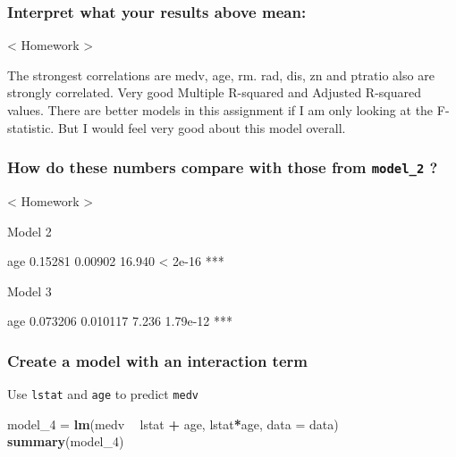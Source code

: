 \documentclass[]{article}
\newenvironment{Shaded}{\begin{snugshade}}{\end{snugshade}}
\newcommand{\DataTypeTok}[1]{\textcolor[rgb]{0.13,0.29,0.53}{#1}}
\newcommand{\DecValTok}[1]{\textcolor[rgb]{0.00,0.00,0.81}{#1}}
\newcommand{\KeywordTok}[1]{\textcolor[rgb]{0.13,0.29,0.53}{\textbf{#1}}}
\newcommand{\NormalTok}[1]{#1}
\newcommand{\OperatorTok}[1]{\textcolor[rgb]{0.81,0.36,0.00}{\textbf{#1}}}
\newcommand{\StringTok}[1]{\textcolor[rgb]{0.31,0.60,0.02}{#1}}
\begin{document}
\hypertarget{interpret-what-your-results-above-mean-3}{%
\subsubsection{Interpret what your results above
mean:}\label{interpret-what-your-results-above-mean-3}}

\textless{} Homework \textgreater{}

The strongest correlations are medv, age, rm. rad, dis, zn and ptratio
also are strongly correlated. Very good Multiple R-squared and Adjusted
R-squared values. There are better models in this assignment if I am
only looking at the F-statistic. But I would feel very good about this
model overall.

\hypertarget{how-do-these-numbers-compare-with-those-from-model_2}{%
\subsubsection{\texorpdfstring{How do these numbers compare with those
from \texttt{model\_2}
?}{How do these numbers compare with those from model\_2 ?}}\label{how-do-these-numbers-compare-with-those-from-model_2}}

\textless{} Homework \textgreater{}

Model 2

age 0.15281 0.00902 16.940 \textless{} 2e-16 ***

Model 3

age 0.073206 0.010117 7.236 1.79e-12 ***

\hypertarget{create-a-model-with-an-interaction-term}{%
\subsubsection{Create a model with an interaction
term}\label{create-a-model-with-an-interaction-term}}

Use \texttt{lstat} and \texttt{age} to predict \texttt{medv}

\begin{Shaded}
\begin{Highlighting}[]
\NormalTok{model_}\DecValTok{4}\NormalTok{ =}\StringTok{ }\KeywordTok{lm}\NormalTok{(medv }\OperatorTok{~}\StringTok{ }\NormalTok{lstat }\OperatorTok{+}\StringTok{ }\NormalTok{age, lstat}\OperatorTok{*}\NormalTok{age, }\DataTypeTok{data =}\NormalTok{ data)}
\KeywordTok{summary}\NormalTok{(model_}\DecValTok{4}\NormalTok{)}
\end{Highlighting}
\end{Shaded}
\end{document}
